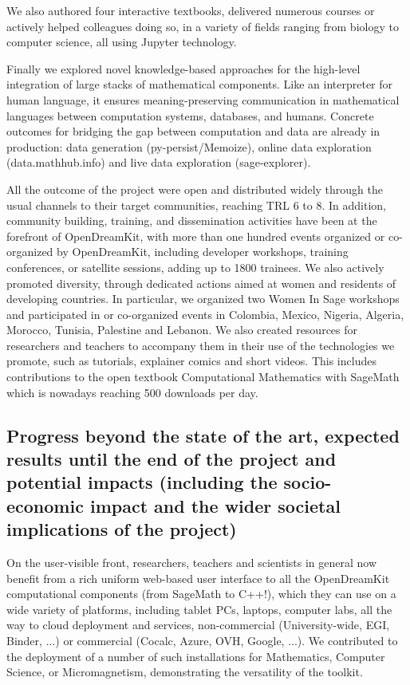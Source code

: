 We also authored four interactive textbooks, delivered numerous courses or actively helped colleagues doing so, in a variety of fields ranging from biology to computer science, all using Jupyter technology.

Finally we explored novel knowledge-based approaches for the high-level integration of large stacks of mathematical components. Like an interpreter for human language, it ensures meaning-preserving communication in mathematical languages between computation systems, databases, and humans. Concrete outcomes for bridging the gap between computation and data are already in production: data generation (py-persist/Memoize), online data exploration (data.mathhub.info) and live data exploration (sage-explorer).

All the outcome of the project were open and distributed widely through the usual channels to their target communities, reaching TRL 6 to 8. In addition, community building, training, and dissemination activities have been at the forefront of OpenDreamKit, with more than one hundred events organized or co-organized by OpenDreamKit, including developer workshops, training conferences, or satellite sessions, adding up to 1800 trainees. We also actively promoted diversity, through dedicated actions aimed at women and residents of developing countries. In particular, we organized two Women In Sage workshops and participated in or co-organized events in Colombia, Mexico, Nigeria, Algeria, Morocco, Tunisia, Palestine and Lebanon. We also created resources for researchers and teachers to accompany them in their use of the technologies we promote, such as tutorials, explainer comics and short videos. This includes contributions to the open textbook Computational Mathematics with SageMath which is nowadays reaching 500 downloads per day.

\subsection{Progress beyond the state of the art, expected results until the end of the project and potential impacts (including the socio-economic impact and the wider societal implications of the project)}

On the user-visible front, researchers, teachers and scientists in general now benefit from a rich uniform web-based user interface to all the OpenDreamKit computational components (from SageMath to C++!), which they can use on a wide variety of platforms, including tablet PCs, laptops, computer labs, all the way to cloud deployment and services, non-commercial (University-wide, EGI, Binder, ...) or commercial (Cocalc, Azure, OVH, Google, ...). We contributed to the deployment of a number of such installations for Mathematics, Computer Science, or Micromagnetism, demonstrating the versatility of the toolkit.

